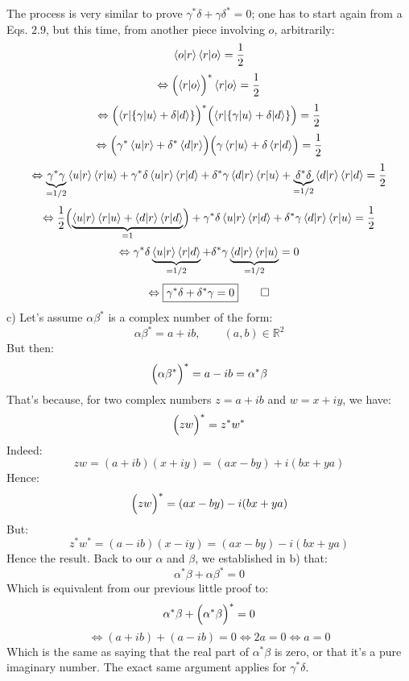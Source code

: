 \documentclass[solutions.tex]{subfiles}
\begin{document}
The process is very similar to prove $\gamma^*\delta + \gamma\delta^* = 0$;
one has to start again from a Eqs. $2.9$, but this time, from another piece
involving $o$, arbitrarily:
\[
	\left\langle o \middle| r \right\rangle\left\langle r \middle| o \right\rangle = \frac1{2}
\]
\[
	\Leftrightarrow
	\Bigl(\left\langle r \middle| o \right\rangle\Bigr)^*\left\langle r \middle| o \right\rangle = \frac12
\]
\[
	\Leftrightarrow
	\Bigl(\langle r|\{\gamma|u\rangle+\delta|d\rangle\}\Bigr)^*
	\Bigl(\langle r|\{\gamma|u\rangle+\delta|d\rangle\}\Bigr) = \frac12
\]
\[
	\Leftrightarrow
	\Bigl(\gamma^*\left\langle u \middle| r \right\rangle+\delta^*\left\langle d \middle| r \right\rangle\Bigr)
	\Bigl(\gamma\left\langle r \middle| u \right\rangle+\delta\left\langle r \middle| d \right\rangle\Bigr) = \frac12
\]
\[
	\Leftrightarrow
	\underbrace{\gamma^*\gamma}_{=1/2}\left\langle u \middle| r \right\rangle\left\langle r \middle| u \right\rangle+
	\gamma^*\delta\left\langle u \middle| r \right\rangle\left\langle r \middle| d \right\rangle+
	\delta^*\gamma\left\langle d \middle| r \right\rangle\left\langle r \middle| u \right\rangle+
	\underbrace{\delta^*\delta}_{=1/2}\left\langle d \middle| r \right\rangle\left\langle r \middle| d \right\rangle = \frac12
\]
\[
	\Leftrightarrow
	\frac12\Bigl(\underbrace{
		\left\langle u \middle| r \right\rangle\left\langle r \middle| u \right\rangle
		+\left\langle d \middle| r \right\rangle\left\langle r \middle| d \right\rangle
	}_{=1}\Bigr)+
	\gamma^*\delta\left\langle u \middle| r \right\rangle\left\langle r \middle| d \right\rangle+
	\delta^*\gamma\left\langle d \middle| r \right\rangle\left\langle r \middle| u \right\rangle = \frac12
\]
\[
	\Leftrightarrow
	\gamma^*\delta\underbrace{\left\langle u \middle| r \right\rangle\left\langle r \middle| d \right\rangle}_{=1/2}+
	\delta^*\gamma\underbrace{\left\langle d \middle| r \right\rangle\left\langle r \middle| u \right\rangle}_{=1/2} = 0
\]
\[
	\Leftrightarrow
	\boxed{\gamma^*\delta+\delta^*\gamma = 0}\qed
\]
\hrr
c) Let's assume $\alpha\beta^*$ is a complex number of the form:
\[
	\alpha\beta^* = a + ib,\qquad (a, b) \in\mathbb{R}^2
\]
But then:
\[
	\Bigl(\alpha\beta^*\Bigr)^* = a - ib = \alpha^*\beta
\]
That's because, for two complex numbers $z=a + ib$ and $w = x + iy$, we have:
\[
	\Bigl(zw\Bigr)^* =z^*w^*
\]
Indeed:
\[
	zw = (a + ib)(x + iy) = (ax - by) + i(bx + ya)
\]
Hence:
\[
	\Bigl(zw\Bigr)^* =  (ax - by) - i(bx + ya)
\]
But:
\[
	z^*w^* = (a - ib)(x - iy) = (ax - by) - i(bx + ya)
\]
Hence the result. Back to our $\alpha$ and $\beta$, we established
in b) that:
\[
	\alpha^*\beta + \alpha\beta^* = 0
\]
Which is equivalent from our previous little proof to:
\[
	\alpha^*\beta + \Bigl(\alpha^*\beta\Bigr)^* = 0
\]
\[
	\Leftrightarrow
	(a+ib) + (a-ib) = 0 \Leftrightarrow 2a = 0
	\Leftrightarrow \boxed{a = 0}
\]
Which is the same as saying that the real part of $\alpha^*\beta$ is zero,
or that it's a pure imaginary number. The exact same argument applies
for $\gamma^*\delta$.
\end{document}
